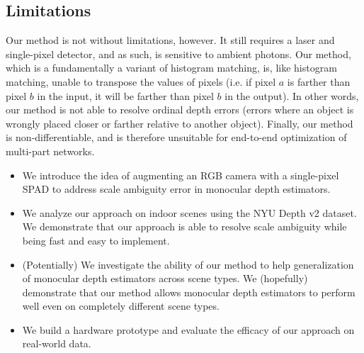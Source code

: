 \subsection{Limitations}
Our method is not without limitations, however. It still requires a laser and
single-pixel detector, and as such, is sensitive to ambient photons. Our method,
which is a fundamentally a variant of histogram matching, is, like histogram
matching, unable to transpose the values of pixels (i.e. if pixel $a$ is farther
than pixel $b$ in the input, it will be farther than pixel $b$ in the output).
In other words, our method is not able to resolve ordinal depth errors
(errors where an object is wrongly placed closer or farther
relative to another object). Finally, our method is non-differentiable, and is
therefore unsuitable for end-to-end optimization of multi-part networks.

\begin{itemize}
	\item We introduce the idea of augmenting an RGB camera with a single-pixel
    SPAD to address scale ambiguity error in monocular depth estimators.	
  \item We analyze our approach on indoor scenes using the NYU Depth v2 dataset.
    We demonstrate that our approach is able to resolve scale ambiguity while
    being fast and easy to implement.
  \item (Potentially) We investigate the ability of our method to 
    help generalization of monocular depth estimators across scene types. 
    We (hopefully) demonstrate that our method allows monocular depth
    estimators to perform well even on completely different scene types.
	\item We build a hardware prototype and evaluate the efficacy of our
    approach on real-world data. 
\end{itemize}


